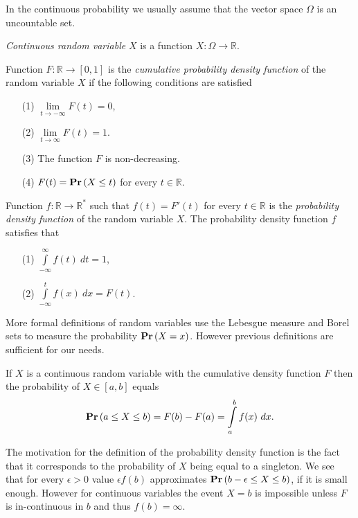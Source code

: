 In the continuous probability we usually assume that the vector space $\Omega$ is an uncountable set.
\begin{definition}
\emph{Continuous random variable} $X$ is a function $X: \Omega \rightarrow \mathbb{R}$. 

Function $F: \mathbb{R} \rightarrow \left[0, 1\right]$ is the \emph{cumulative probability density function} of the random variable $X$ if the following conditions are satisfied
\begin{enumerate}
\item[(1)] $\lim\limits_{t \rightarrow -\infty} F(t) = 0$,
\item[(2)] $\lim\limits_{t \rightarrow \infty} F(t) = 1$.
\item[(3)] The function $F$ is non-decreasing.
\item[(4)] $F(t) = \mathbf{Pr}\left(X \leq t\right) $ for every $t \in \mathbb{R}$.
\end{enumerate}

Function $f: \mathbb{R} \rightarrow \mathbb{R}^{*}$ such that $f(t) = F'(t)$ for every $t \in \mathbb{R}$ is the \emph{probability density function} of the random variable $X$. The probability density function $f$ satisfies that
\begin{enumerate}
\item[(1)] $\int\limits_{-\infty}^{\infty} f(t) \ dt = 1$,
\item[(2)] $\int\limits_{-\infty}^{t} f(x) \ dx = F(t)$.
\end{enumerate}
\end{definition}

More formal definitions of random variables use the Lebesgue measure and Borel sets to measure the probability $\mathbf{Pr}\left(X = x\right)$. However previous definitions are sufficient for our needs.

If $X$ is a continuous random variable with the cumulative density function $F$ then the probability of $X \in \left[a, b\right]$ equals
\[
\mathbf{Pr}\left(a \leq X \leq b\right) = F(b) - F(a) = \int\limits_{a}^{b} f(x) \ dx \text{.}
\]

The motivation for the definition of the probability density function is the fact that it corresponds to the probability of $X$ being equal to a singleton. We see that for every $\epsilon > 0$ value $\epsilon f(b)$ approximates $\mathbf{Pr}\left(b - \epsilon \leq X \leq b\right)$, if it is small enough. However for continuous variables the event $X = b$ is impossible unless $F$ is in-continuous in $b$ and thus $f(b) = \infty$.	


